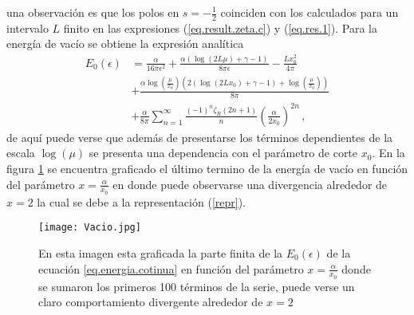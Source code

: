 una observación es que los polos en $s = -\frac{1}{2}$ coinciden con los calculados para un intervalo $L$ finito en las expresiones (\ref{eq.result.zeta.c}) y (\ref{eq.res.1}).
Para la energía de vacío se obtiene la expresión analítica
\begin{align}
\label{eq.energia.cotinua}
	E _0 ( \epsilon ) 
&	
	=
\nonumber
	\frac{\alpha}{16 \pi  \epsilon  ^2} +
	\frac{\alpha \left( \log (2 L \mu ) + \gamma -1  \right)}{8 \pi \epsilon } -
	\frac{L x _0 ^2}{4 \pi}
\\
\nonumber
&
+
	\frac{\alpha \log \left( \frac{\mu}{x _0} \right) 	
		\left( 2 (\log ( 2 L x_0) + \gamma -1 ) + \log \left( \frac{\mu}{x _0}\right)  \right) }{8 \pi}
\\
&
+	
	\frac{\alpha }{8 \pi} 
	\sum _{n=1} ^{\infty} \frac{(-1) ^{n} \zeta _R (2n+1) }{n}  
	\left( \frac{\alpha}{2 x _0} \right) ^{2n}
\, ,
\end{align}
de aquí puede verse que además de presentarse los términos dependientes de la escala $\log ( \mu )$ se presenta una dependencia con el parámetro de corte $x _0$.
En la figura \ref{fig:vacio} se encuentra graficado el último termino de la energía de vacío en función del parámetro $x = \frac{\alpha}{x_0}$ en donde puede observarse una divergencia alrededor de $x=2$ la cual se debe a la representación (\ref{repr}).

\begin{figure}
    \centering
    \texttt{[image: Vacio.jpg]}
    \caption{En esta imagen esta graficada la parte finita de la $E _0 (\epsilon) $ de la ecuación \ref{eq.energia.cotinua} en función del parámetro $x= \frac{\alpha}{x _0}$ donde se sumaron los primeros 100 términos de la serie, puede verse un claro comportamiento divergente alrededor de $x=2$}
    \label{fig:vacio}
\end{figure}



